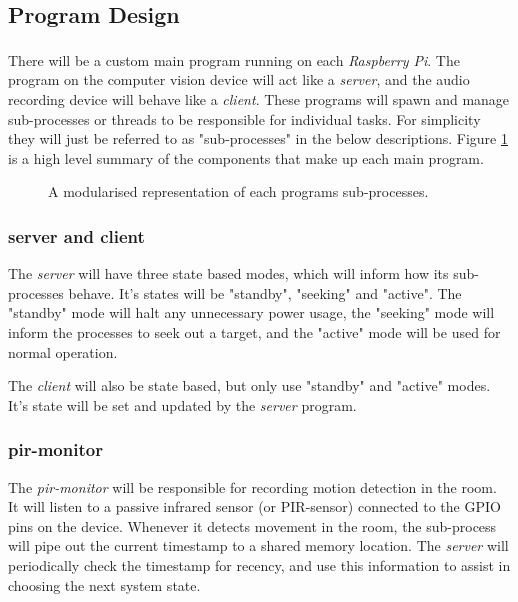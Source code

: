 \documentclass[11pt,a4paper,titlepage]{report}
\newcommand{\rpi}{\textit{Raspberry Pi\textsuperscript{\textregistered}}}
\begin{document}
\subsection{Program Design}

There will be a custom main program running on each \rpi. The program on the computer vision device will act like a \textit{server}, and the audio recording device will behave like a \textit{client}. These programs will spawn and manage sub-processes or threads to be responsible for individual tasks. For simplicity they will just be referred to as "sub-processes" in the below descriptions. Figure \ref{fig:processes} is a high level summary of the components that make up each main program.

\begin{figure}
\begin{multicols}{2}
\columnbreak
{}
\end{multicols}
\caption{A modularised representation of each programs sub-processes.}\label{fig:processes}
\end{figure}

\subsubsection{server and client}


The \textit{server} will have three state based modes, which will inform how its sub-processes behave. It's states will be "standby", "seeking" and "active". The "standby" mode will halt any unnecessary power usage, the "seeking" mode will inform the processes to seek out a target, and the "active" mode will be used for normal operation. 

The \textit{client} will also be state based, but only use "standby" and "active" modes. It's state will be set and updated by the \textit{server} program.

\subsubsection{pir-monitor}

The \textit{pir-monitor} will be responsible for recording motion detection in the room. It will listen to a passive infrared sensor (or PIR-sensor) connected to the GPIO pins on the device. Whenever it detects movement in the room, the sub-process will pipe out the current timestamp to a shared memory location. The \textit{server} will periodically check the timestamp for recency, and use this information to assist in choosing the next system state.
\end{document}
